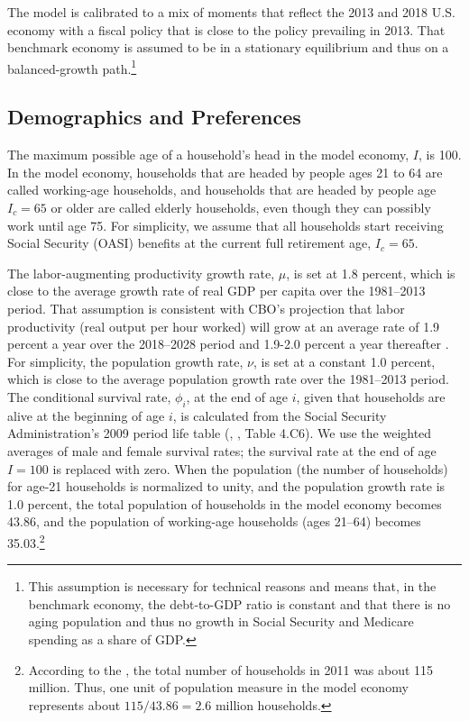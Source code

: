 \documentclass[11pt,leqno,fleqn]{article}
\begin{document}
The model is calibrated to a mix of moments that reflect the 2013 and 2018 U.S. economy with a fiscal policy that is close to the policy prevailing in 2013. That benchmark economy is assumed to be in a stationary equilibrium and thus on a balanced-growth path.\footnote{This assumption is necessary for technical reasons and means that, in the benchmark economy, the debt-to-GDP ratio is constant and that there is no aging population and thus no growth in Social Security and Medicare spending as a share of GDP.}  


\subsection{Demographics and Preferences}

The maximum possible age of a household's head in the model economy, $I$, is 100. In the model economy, households that are headed by people ages 21 to 64 are called working-age households, and households that are headed by people age $I_c=65$ or older are called elderly households, even though they can possibly work until age 75. For simplicity, we assume that all households start receiving Social Security (OASI) benefits at the current full retirement age, $I_c=65$.

The labor-augmenting productivity growth rate, $\mu$, is set at 1.8 percent, which is close to the average growth rate of real GDP per capita over the 1981--2013 period. That assumption is consistent with CBO's projection that labor productivity (real output per hour worked) will grow at an average rate of 1.9 percent a year over the 2018--2028 period and 1.9-2.0 percent a year thereafter \citep{CBO_LTBO:2018}. For simplicity, the population growth rate, $\nu$, is set at a constant 1.0 percent, which is close to the average population growth rate over the 1981--2013 period. The conditional survival rate, $\phi_{i}$, at the end of age $i$, given that households are alive at the beginning of age $i$, is calculated from the Social Security Administration's 2009 period life table (\citeauthor{SSA:2014}, \citeyear{SSA:2014}, Table 4.C6). We use the weighted averages of male and female survival rates; the survival rate at the end of age $I=100$ is replaced with zero. When the population (the number of households) for age-21 households is normalized to unity, and the population growth rate is 1.0 percent, \color{red}the total population of households in the model economy becomes 43.86, and the population of working-age households (ages 21--64) becomes 35.03.\footnote{\color{red}According to the \citet{U.S.CensusBureau:2013}, the total number of households in 2011 was about 115 million. Thus, one unit of population measure in the model economy represents about $115/43.86=2.6$ million households.}
\color{black}
\end{document}
